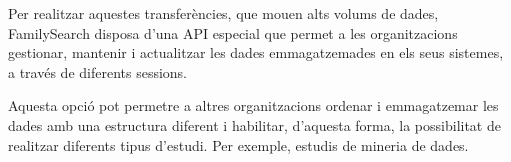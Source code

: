         Per realitzar aquestes transferències, que mouen alts volums de dades, FamilySearch disposa d'una API especial que permet a les organitzacions gestionar, mantenir i actualitzar les dades emmagatzemades en els seus sistemes, a través de di\-fe\-rents sessions.

        Aquesta opció pot permetre a altres organitzacions ordenar i emmagatzemar les dades amb una estructura diferent i habilitar, d'aquesta forma, la possibilitat de realitzar diferents tipus d'estudi. Per exemple, estudis de mineria de dades.
